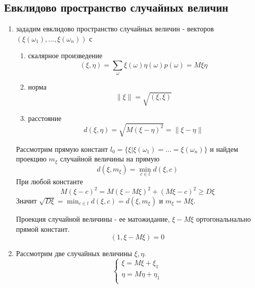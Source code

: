 \documentclass[a4paper]{article}
\theoremstyle{definition}
\theoremstyle{remark}
\begin{document}
\subsection{Евклидово пространство случайных величин}
\begin{enumerate}
    \item зададим евклидово пространство случайных величин - векторов $(\xi(\omega_1), \dots, \xi(\omega_n))$ с 
    \begin{enumerate}
        \item скалярное произведение \[(\xi, \eta) = \sum_{\omega}\xi(\omega)\eta(\omega)p(\omega)=  M\xi\eta\]
        \item норма \[\left\lVert \xi\right\rVert =\sqrt{(\xi, \xi)}\]
        \item расстояние \[d(\xi, \eta) = \sqrt{M(\xi-\eta)^2} = \left\lVert \xi-\eta\right\rVert\]
    \end{enumerate}
    Рассмотрим прямую констант $l_0 = \{\xi | \xi(\omega_1) = \dots = \xi(\omega_n)\}$ и найдем проекцию $m_\xi$ случайной величины на прямую 
    \[d(\xi, m_\xi) = \min_{c\in l}d(\xi, c)\]
    При любой константе 
    \[M(\xi-c)^2 = M(\xi - M\xi)^2 + (M\xi -c)^2 \ge D\xi\]
    Значит $\sqrt{D\xi} = \min_{c\in l}d(\xi, c) = d(\xi, m_\xi) $ и $m_\xi = M\xi$.
    
    Проекция случайной величины - ее матожидание, $\xi - M\xi$ ортогональнально прямой констант. 
    \[(1, \xi - M\xi) = 0\]
    \item Рассмотрим две случайных величины $\xi, \eta$.
    \[\begin{cases}
        \xi = M\xi +\xi_1 \\
        \eta = M\eta +\eta_1 \\
    \end{cases}\]


\end{enumerate}
\end{document}
